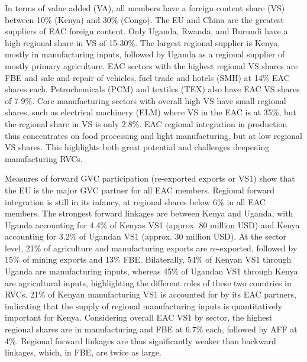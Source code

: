 \documentclass[a4paper]{article}
\begin{document}
In terms of value added (VA), all members have a foreign content share (VS) between 10\% (Kenya) and 30\% (Congo). The EU and China are the greatest suppliers of EAC foreign content. Only Uganda, Rwanda, and Burundi have a high regional share in VS of 15-30\%. The largest regional supplier is Kenya, mostly in manufacturing inputs, followed by Uganda as a regional supplier of mostly primary agriculture. EAC sectors with the highest regional VS shares are FBE and sale and repair of vehicles, fuel trade and hotels (SMH) at 14\% EAC shares each. Petrochemicals (PCM) and textiles (TEX) also have EAC VS shares of 7-9\%. Core manufacturing sectors with overall high VS have small regional shares, such as electrical machinery (ELM) where VS in the EAC is at 35\%, but the regional share in VS is only 2.8\%. EAC regional integration in production thus concentrates on food processing and light manufacturing, but at low regional VS shares. This highlights both great potential and challenges deepening manufacturing RVCs.  \newline

Measures of forward GVC participation (re-exported exports or VS1) show that the EU is the major GVC partner for all EAC members. Regional forward integration is still in its infancy, at regional shares below 6\% in all EAC members. The strongest forward linkages are between Kenya and Uganda, with Uganda accounting for 4.4\% of Kenyas VS1 (approx. 80 million USD) and Kenya accounting for 3.2\% of Ugandan VS1 (approx. 30 million USD). At the sector level, 21\% of agriculture and manufacturing exports are re-exported, followed by 15\% of mining exports and 13\% FBE. Bilaterally, 54\% of Kenyan VS1 through Uganda are manufacturing inputs, whereas 45\% of Ugandan VS1 through Kenya are agricultural inputs, highlighting the different roles of these two countries in RVCs. 21\% of Kenyan manufacturing VS1 is accounted for by its EAC partners, indicating that the supply of regional manufacturing inputs is quantitatively important for Kenya. Considering overall EAC VS1 by sector, the highest regional shares are in manufacturing and FBE at 6.7\% each, followed by AFF at 4\%. Regional forward linkages are thus significantly weaker than backward linkages, which, in FBE, are twice as large. \newline
\end{document}
